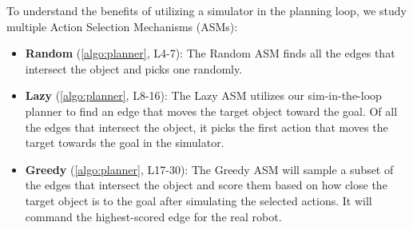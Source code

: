 To understand the benefits of utilizing a simulator in the planning loop, we study multiple Action Selection Mechanisms (ASMs):
\begin{itemize}
    \item \textbf{\color{dusty_pink}Random} (\cref{algo:planner}, L4-7): The Random ASM finds all the edges that intersect the object and picks one randomly.
    \item \textbf{\color{dusty_green}Lazy} (\cref{algo:planner}, L8-16): The Lazy ASM utilizes our sim-in-the-loop planner to find an edge that moves the target object toward the goal. Of all the edges that intersect the object, it picks the first action that moves the target towards the goal in the simulator.
    \item \textbf{\color{dusty_blue}Greedy} (\cref{algo:planner}, L17-30): The Greedy ASM will sample a subset of the edges that intersect the object and score them based on how close the target object is to the goal after simulating the selected actions. It will command the highest-scored edge for the real robot.
\end{itemize}





